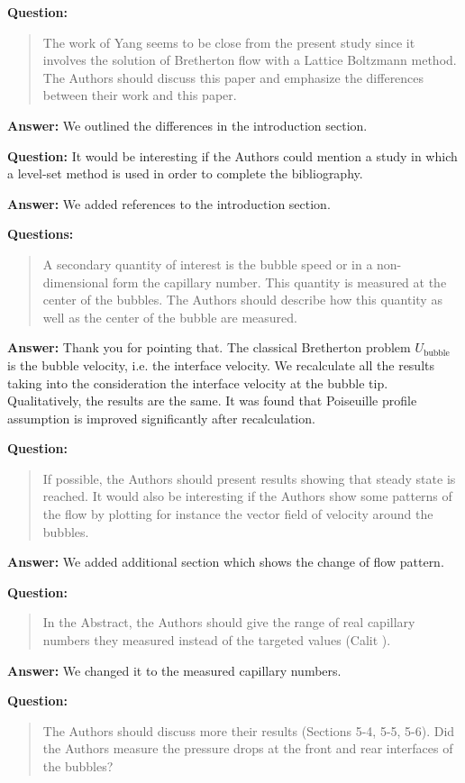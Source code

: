 \documentclass{article}
\begin{document}
\textbf{Question:}
\begin{quotation}
The work of Yang seems to be close from the present study since it involves the
solution of Bretherton
ﬂow with a Lattice Boltzmann method. The Authors should discuss this paper and emphasize the
differences between their work and this paper.
\end{quotation}

\textbf{Answer:} We outlined the differences in the introduction section.

\textbf{Question:} It would be interesting if the Authors could mention a study in which a level-set
method is used in
order to complete the bibliography.

\textbf{Answer:} We added references to the introduction section.

\textbf{Questions:} 
\begin{quotation}
A secondary quantity of interest is the bubble speed or in a non-dimensional
form the capillary
number. This quantity is measured at the center of the bubbles. The Authors should describe how
this quantity as well as the center of the bubble are measured.
\end{quotation}

\textbf{Answer:} Thank you for pointing that. The classical Bretherton problem
$U_{\mathrm{bubble}}$ is the bubble velocity, i.e. the interface velocity. We recalculate all the
results taking into the consideration the interface velocity at the bubble tip. Qualitatively, the
results are the same. It was found that Poiseuille profile assumption is improved significantly
after recalculation.

\textbf{Question:} 
\begin{quotation}
 If possible, the Authors should present results showing that steady state is reached. It would
also
be interesting if the Authors show some patterns of the ﬂow by plotting for instance the vector ﬁeld
of velocity around the bubbles.
\end{quotation}

\textbf{Answer:} We added additional section which shows the change of flow pattern. 

\textbf{Question:}
\begin{quotation}
In the Abstract, the Authors should give the range of real capillary numbers they measured instead
of the targeted values (Calit ).
\end{quotation}

\textbf{Answer:} We changed it to the measured capillary numbers.

\textbf{Question:} 
\begin{quotation}
The Authors should discuss more their results (Sections 5-4, 5-5, 5-6). Did the Authors measure the
pressure drops at the front and rear interfaces of the bubbles?
\end{quotation}

 



\end{document}
